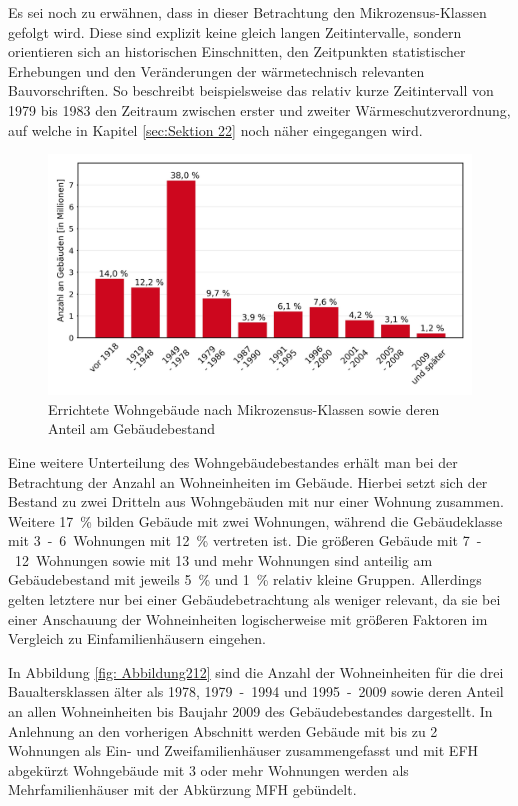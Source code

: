 Es sei noch zu erwähnen, dass in dieser Betrachtung den Mikrozensus-Klassen gefolgt wird. 
Diese sind explizit keine gleich langen Zeitintervalle, sondern \glqq orientieren sich an historischen Einschnitten, den Zeitpunkten statistischer Erhebungen und den Veränderungen der wärmetechnisch relevanten Bauvorschriften\grqq \cite{.2015}. 
So beschreibt beispielsweise das relativ kurze Zeitintervall von 1979 bis 1983 den Zeitraum zwischen erster und zweiter Wärmeschutzverordnung, auf welche in Kapitel \ref{sec:Sektion 22} noch näher eingegangen wird.

\begin{figure}[H]
	\centering
		\includegraphics{Pictures/GebaeudeAlterDiagramm.jpg}
	\caption{Errichtete Wohngebäude nach Mikrozensus-Klassen sowie deren Anteil am Gebäudebestand \cite{StatistischeAmterdesBundesundderLander.2014}}
	\label{fig: Abbildung211} 
\end{figure}

Eine weitere Unterteilung des Wohngebäudebestandes erhält man bei der Betrachtung der Anzahl an Wohneinheiten im Gebäude. 
Hierbei setzt sich der Bestand zu zwei Dritteln aus Wohngebäuden mit nur einer Wohnung zusammen. 
Weitere \mbox{17 \%} bilden Gebäude mit zwei Wohnungen, während die Gebäudeklasse mit \mbox{3 - 6 Wohnungen} mit \mbox{12 \%} vertreten ist. 
Die größeren Gebäude mit \mbox{7 - 12 Wohnungen} sowie mit 13 und mehr Wohnungen sind anteilig am Gebäudebestand mit jeweils \mbox{5 \%} und \mbox{1 \%} relativ kleine Gruppen. 
Allerdings gelten letztere nur bei einer Gebäudebetrachtung als weniger relevant, da sie bei einer Anschauung der Wohneinheiten logischerweise mit größeren Faktoren im Vergleich zu Einfamilienhäusern eingehen. \cite{StatistischeAmterdesBundesundderLander.2014b}

In Abbildung \ref{fig: Abbildung212} sind die Anzahl der Wohneinheiten für die drei Baualtersklassen älter als 1978, \mbox{1979 - 1994} und \mbox{1995 - 2009} sowie deren Anteil an allen Wohneinheiten bis Baujahr 2009 des Gebäudebestandes dargestellt. 
In Anlehnung an den vorherigen Abschnitt werden Gebäude mit bis zu 2 Wohnungen als Ein- und Zweifamilienhäuser zusammengefasst und mit EFH abgekürzt
Wohngebäude mit 3 oder mehr Wohnungen werden als Mehrfamilienhäuser mit der Abkürzung MFH gebündelt. 

